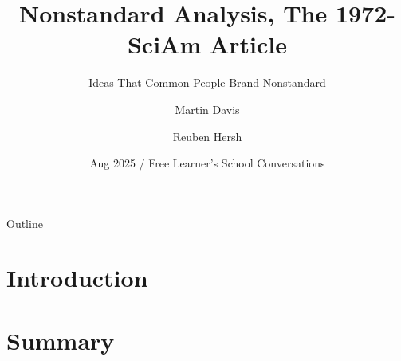 \documentclass{beamer}
\title[Nonstandard Analysis] %
{Nonstandard Analysis, The 1972-SciAm Article}
\subtitle
{Ideas That Common People Brand Nonstandard} %
\author[MD,RH,KM] %
{Martin Davis\inst{1} \and Reuben Hersh\inst{2}}
\institute[Unknown] %
{
  \inst{1}%
  Original Author
  \and
  \inst{2}%
  Original Author
  }
\date[August 2025] %
{Aug 2025 / Free Learner's School Conversations}
\begin{document}
\begin{frame}
  \titlepage
\end{frame}

\begin{frame}{Outline}
  \tableofcontents
\end{frame}




\section{Introduction}


























\section{Summary}


\end{document}
